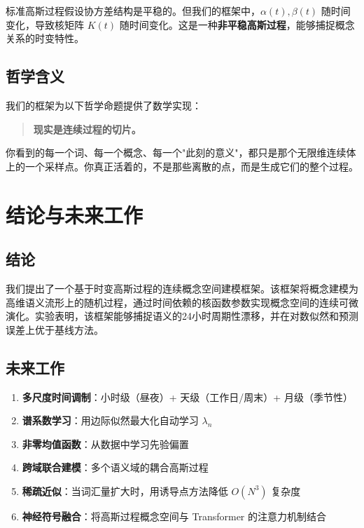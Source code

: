 \documentclass[12pt, a4paper]{article}
\begin{document}
标准高斯过程假设协方差结构是平稳的。但我们的框架中，$\alpha(t), \beta(t)$ 随时间变化，导致核矩阵 $K(t)$ 随时间变化。这是一种\textbf{非平稳高斯过程}，能够捕捉概念关系的时变特性。

\subsection{哲学含义}

我们的框架为以下哲学命题提供了数学实现：

\begin{quote}
\textbf{现实是连续过程的切片。}
\end{quote}

你看到的每一个词、每一个概念、每一个"此刻的意义"，都只是那个无限维连续体上的一个采样点。你真正活着的，不是那些离散的点，而是生成它们的整个过程。

\section{结论与未来工作}

\subsection{结论}

我们提出了一个基于时变高斯过程的连续概念空间建模框架。该框架将概念建模为高维语义流形上的随机过程，通过时间依赖的核函数参数实现概念空间的连续可微演化。实验表明，该框架能够捕捉语义的24小时周期性漂移，并在对数似然和预测误差上优于基线方法。

\subsection{未来工作}

\begin{enumerate}
    \item \textbf{多尺度时间调制}：小时级（昼夜）+ 天级（工作日/周末）+ 月级（季节性）
    \item \textbf{谱系数学习}：用边际似然最大化自动学习 $\lambda_n$
    \item \textbf{非零均值函数}：从数据中学习先验偏置
    \item \textbf{跨域联合建模}：多个语义域的耦合高斯过程
    \item \textbf{稀疏近似}：当词汇量扩大时，用诱导点方法降低 $O(N^3)$ 复杂度
    \item \textbf{神经符号融合}：将高斯过程概念空间与 Transformer 的注意力机制结合
\end{enumerate}
\end{document}
